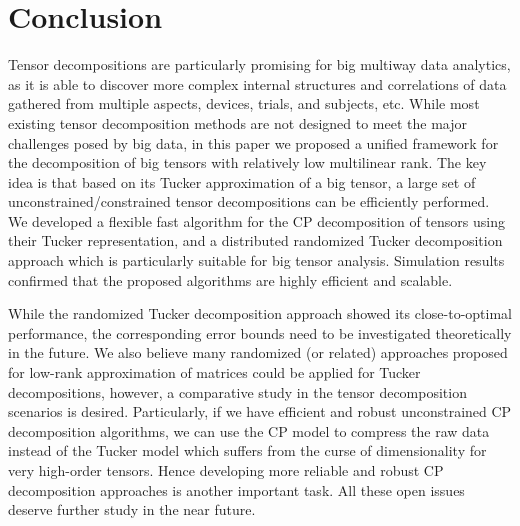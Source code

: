 \documentclass[10pt,twocolumn,twoside]{IEEEtran}
\begin{document}
\section{Conclusion}
\label{sec:conclusion}
Tensor decompositions are particularly promising for big multiway data analytics, as it is able to discover more complex internal structures and correlations of data gathered from multiple aspects, devices, trials, and subjects, etc. While most existing tensor decomposition methods are not designed to meet the major challenges posed by big data, in this paper we proposed a unified framework for the decomposition of big tensors with relatively low multilinear rank. The key idea is that based on its Tucker approximation of a big tensor, a large set of unconstrained/constrained tensor decompositions can be efficiently performed. We developed a flexible fast algorithm for the CP decomposition of tensors using their Tucker representation, and a distributed randomized Tucker decomposition approach which is particularly suitable for big tensor analysis. Simulation results confirmed that the proposed algorithms are highly efficient and scalable. 

While the randomized Tucker decomposition approach showed its close-to-optimal performance, the corresponding error bounds need to be investigated theoretically in the future. We also believe many randomized (or related) approaches proposed for low-rank approximation of matrices \cite{siam_probLowRank,LRApIEEE} could be applied for Tucker decompositions, however, a comparative study in the tensor decomposition scenarios is desired. Particularly, if we have efficient and robust unconstrained CP decomposition algorithms, we can use the CP model to compress the raw data instead of the Tucker model which suffers from the curse of dimensionality for very high-order tensors. Hence developing more reliable and robust CP decomposition approaches is another important task. All these open issues deserve further study in the near future.





\end{document}
